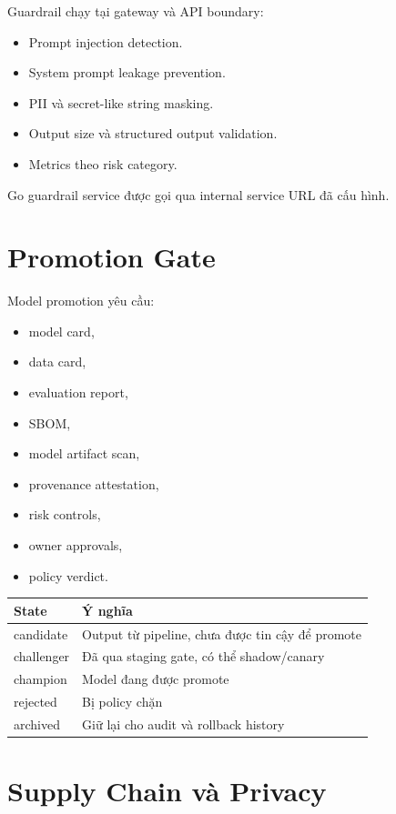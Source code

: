 \documentclass[12pt,a4paper,oneside]{report}
\begin{document}
Guardrail chạy tại gateway và API boundary:

\begin{itemize}
  \item Prompt injection detection.
  \item System prompt leakage prevention.
  \item PII và secret-like string masking.
  \item Output size và structured output validation.
  \item Metrics theo risk category.
\end{itemize}

Go guardrail service được gọi qua internal service URL đã cấu hình.

\section{Promotion Gate}

Model promotion yêu cầu:

\begin{itemize}
  \item model card,
  \item data card,
  \item evaluation report,
  \item SBOM,
  \item model artifact scan,
  \item provenance attestation,
  \item risk controls,
  \item owner approvals,
  \item policy verdict.
\end{itemize}

\begin{center}
\begin{tabular}{ll}
\toprule
\textbf{State} & \textbf{Ý nghĩa} \\
\midrule
candidate & Output từ pipeline, chưa được tin cậy để promote \\
challenger & Đã qua staging gate, có thể shadow/canary \\
champion & Model đang được promote \\
rejected & Bị policy chặn \\
archived & Giữ lại cho audit và rollback history \\
\bottomrule
\end{tabular}
\end{center}

\section{Supply Chain và Privacy}
\end{document}
